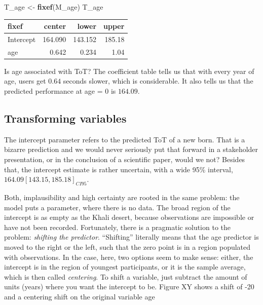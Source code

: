 \documentclass[]{svmono}
\newenvironment{Shaded}{\begin{snugshade}}{\end{snugshade}}
\newcommand{\KeywordTok}[1]{\textcolor[rgb]{0.13,0.29,0.53}{\textbf{#1}}}
\newcommand{\DataTypeTok}[1]{\textcolor[rgb]{0.13,0.29,0.53}{#1}}
\newcommand{\DecValTok}[1]{\textcolor[rgb]{0.00,0.00,0.81}{#1}}
\newcommand{\StringTok}[1]{\textcolor[rgb]{0.31,0.60,0.02}{#1}}
\newcommand{\OperatorTok}[1]{\textcolor[rgb]{0.81,0.36,0.00}{\textbf{#1}}}
\newcommand{\NormalTok}[1]{#1}
\theoremstyle{definition}
\theoremstyle{definition}
\theoremstyle{definition}
\theoremstyle{remark}
\begin{document}
\begin{Shaded}
\end{Shaded}

\begin{Shaded}
\begin{Highlighting}[]
\NormalTok{T_age <-}\StringTok{ }\KeywordTok{fixef}\NormalTok{(M_age)}
\NormalTok{T_age}
\end{Highlighting}
\end{Shaded}

\begin{longtable}[]{@{}lrrr@{}}
\toprule
fixef & center & lower & upper\tabularnewline
\midrule
\endhead
Intercept & 164.090 & 143.152 & 185.18\tabularnewline
age & 0.642 & 0.234 & 1.04\tabularnewline
\bottomrule
\end{longtable}

Is age associated with ToT? The coefficient table tells us that with
every year of age, users get \(0.64\) seconds slower, which is
considerable. It also tells us that the predicted performance at age = 0
is \(164.09\).

\subsection{Transforming variables}\label{transforming-variables}

The intercept parameter refers to the predicted ToT of a new born. That
is a bizarre prediction and we would never seriously put that forward in
a stakeholder presentation, or in the conclusion of a scientific paper,
would we not? Besides that, the intercept estimate is rather uncertain,
with a wide 95\% interval, \(164.09 [143.15, 185.18]_{CI95}\).

Both, implausibility and high certainty are rooted in the same problem:
the model puts a parameter, where there is no data. The broad region of
the intercept is as empty as the Khali desert, because observations are
impossible or have not been recorded. Fortunately, there is a pragmatic
solution to the problem: \emph{shifting the predictor}. ``Shifting''
literally means that the age predictor is moved to the right or the
left, such that the zero point is in a region populated with
observations. In the case, here, two options seem to make sense: either,
the intercept is in the region of youngest participants, or it is the
sample average, which is then called \emph{centering}. To shift a
variable, just subtract the amount of units (years) where you want the
intercept to be. Figure XY shows a shift of -20 and a centering shift on
the original variable age
\end{document}
